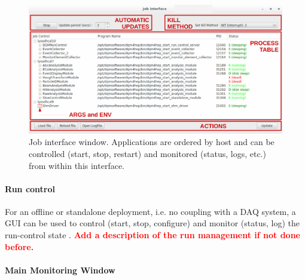 \documentclass{webofc}
\begin{document}
\begin{figure}
\centering
\includegraphics[width=.95\textwidth]{figs/JobControlInterface.pdf}
\caption{Job interface window. Applications are ordered by host and can be controlled (start, stop, restart) and monitored (status, logs, etc.) from within this interface.}
\label{fig:JobControlGUI}
\end{figure}


\paragraph{Run control}\label{par:RunControl}

For an offline or standalone deployment, i.e. no coupling with a DAQ system, a GUI can be used to control (start, stop, configure) and monitor (status, log) the run-control state . \textcolor{red}{\textbf{Add a description of the run management if not done before.}} 

\paragraph{Main Monitoring Window}\label{par:MainGUI}
\end{document}
